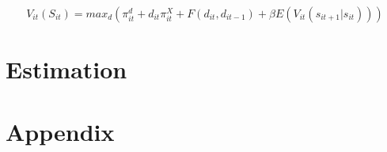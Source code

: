 \documentclass[11pt]{article}
\begin{document}
\begin{equation}
V_{it}(S_{it}) = max_d(\pi_{it}^{d} +d_{it}\pi_{it}^{X} + F(d_{it}, d_{it-1}) + \beta E(V_{it}(s_{it+1}|s_{it})))
\end{equation}






 




\section{Estimation}
\printbibliography[omitnumbers=false]
\section{Appendix}
\end{document}
